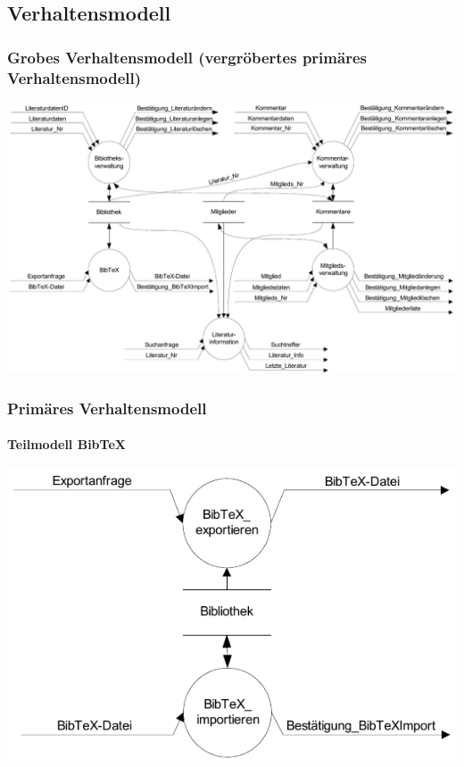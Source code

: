 \subsection{Verhaltensmodell}
\subsubsection{Grobes Verhaltensmodell (vergröbertes primäres Verhaltensmodell)}
\includegraphics[scale=0.70]{grobes_verhaltensmodell}

\subsubsection{Primäres Verhaltensmodell}
\paragraph{Teilmodell BibTeX}
\includegraphics[scale=1.0]{teilmodell_bibtex}

